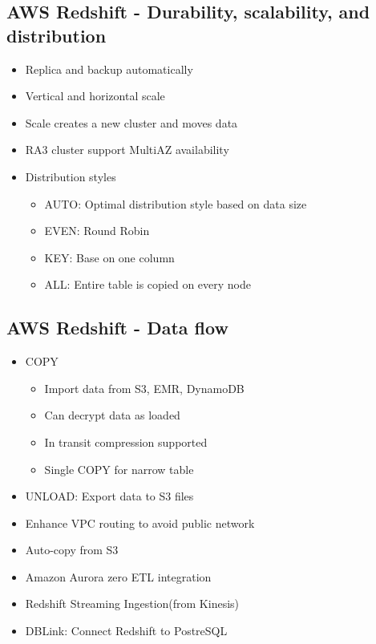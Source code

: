 \documentclass[../main.tex]{subfiles}
\begin{document}
\subsection{AWS Redshift - Durability, scalability, and distribution}
\begin{itemize}
    \item Replica and backup automatically
    \item Vertical and horizontal scale
    \item Scale creates a new cluster and moves data
    \item RA3 cluster support MultiAZ availability
    \item Distribution styles
    \begin{itemize}
        \item AUTO: Optimal distribution style based on data size
        \item EVEN: Round Robin
        \item KEY: Base on one column
        \item ALL: Entire table is copied on every node
    \end{itemize}
\end{itemize}

\subsection{AWS Redshift - Data flow}
\begin{itemize}
    \item COPY
    \begin{itemize}
        \item Import data from S3, EMR, DynamoDB
        \item Can decrypt data as loaded
        \item In transit compression supported
        \item Single COPY for narrow table
    \end{itemize}
    \item UNLOAD: Export data to S3 files
    \item Enhance VPC routing to avoid public network
    \item Auto-copy from S3
    \item Amazon Aurora zero ETL integration
    \item Redshift Streaming Ingestion(from Kinesis)
    \item DBLink: Connect Redshift to PostreSQL
\end{itemize}
\end{document}
